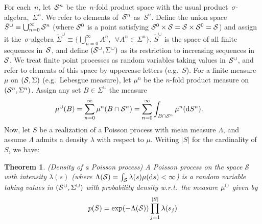 \documentclass{statsoc}
\newtheorem{thrm}[defn]{Theorem}
\begin{document}
For each~$n$, let~${\mathcal S}^n$ be the~$n$-fold product space with the usual product~$\sigma$-algebra,~$\Sigma^n$. We refer
to elements of~${\mathcal S}^n$ as~$S^n$. %
Define the union space ${\tilde{S}^{\cup} \equiv \bigcup_{n=0}^{\infty} {\mathcal S}^n}$ (where 
${\mathcal S}^0$ is a point satisfying ${{\mathcal S}^0 \times {\mathcal S} = {\mathcal S} \times {\mathcal S}^0 = {\mathcal S}}$) and assign it 
the~$\sigma$-algebra $\tilde{\Sigma}^{\cup} \equiv \{\bigcup_{n=0}^{\infty} A^n, \ \ \forall A^n \in \Sigma^n\}$. 
$\tilde{S}^{\cup}$ is the space of all finite sequences in~${\mathcal S}$, and define $(\mathcal{S}^{\cup}, \Sigma^{\cup})$ as its restriction to {increasing} sequences
in ${\mathcal S}$. We treat finite point processes as random variables taking values in $\mathcal{S}^{\cup}$, and refer to elements of this space
by uppercase letters (e.g.\ $S$). %
For a finite measure $\mu$ on $({\mathcal S},\Sigma)$ (e.g.\ Lebesgue measure), let $\mu^n$ be the $n$-fold product measure on~$({\mathcal S}^n, \Sigma^n)$.
Assign any set $B \in \Sigma^{\cup}$ the measure
\begin{align}
  \mu^{\cup}(B) &= \sum_{n=0}^{\infty} \mu^n(B \cap {\mathcal S}^n)
         = \sum_{n=0}^{\infty} \int_{B \cap {\mathcal S}^n}  \mu^n(\mathrm{d} S^n). \label{eq:base_measure1}
\end{align}
Now, let $S$ be a realization of a Poisson process with mean measure $\Lambda$, and assume $\Lambda$ %
admits a density $\lambda$ with respect to $\mu$. 
Writing $|S|$ for the cardinality of $S$, we have:
\begin{thrm} \emph{(Density of a Poisson process)} \label{thrm:poiss_density}
  A Poisson process on the space $\mathcal{S}$  with intensity $\lambda(s)$ (where $\Lambda({\mathcal S}) = \int_{{\mathcal S}} \lambda(s) \mu(\mathrm{d} s) < \infty$) is a random variable taking values in $(\mathcal{S}^{\cup}, \Sigma^{\cup})$ with 
probability 
density w.r.t.\ the measure $\mu^{\cup}$
given by 
\vspace{-.05in}
\begin{align}
  p(S) = \exp(-\Lambda({\mathcal S})) \prod_{j=1}^{|S|} \lambda(s_j)  \label{eq:poiss_prob}
\end{align}
\end{thrm}
\end{document}
